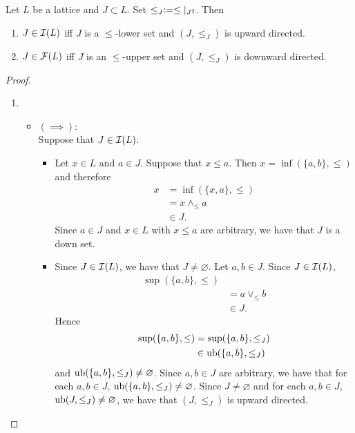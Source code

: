 \documentclass{book}
\begin{document}
	\begin{ex}
		Let $L$ be a lattice and $J \subset L$. Set $\leq_J \vcentcolon= \leq|_{J^2}$. Then
		\begin{enumerate}
			\item $J \in \mathcal{I}(L)$ iff $J$ is a $\leq$-lower set and $(J, \leq_J)$ is upward directed.   
			\item $J \in \mathcal{F}(L)$ iff $J$ is an $\leq$-upper set and $(J, \leq_J)$ is downward directed.
		\end{enumerate}
	\end{ex}
	
	\begin{proof}\
		\begin{enumerate}
			\item 
			\begin{itemize}
				\item $(\implies)$: \\
				Suppose that $J \in \mathcal{I}(L)$.
				\begin{itemize}
					\item Let $x \in L$ and $a \in J$. Suppose that $x \leq a$. Then $x = \inf(\{a,b\}, \leq)$ and therefore
					\begin{align*}
						x
						& = \inf(\{x, a\}, \leq) \\
						& = x \wedge_{\leq} a \\
						& \in J. 
					\end{align*}  
					Since $a \in J$ and $x \in L$ with $x \leq a$ are arbitrary, we have that $J$ is a down set. 
					\item Since $J \in \mathcal{I}(L)$, we have that $J \neq \varnothing$. Let $a, b \in J$. Since $J \in \mathcal{I}(L)$, 
					\begin{align*}
						\sup (\{a,b\}, \leq) \\
						& = a \vee_{\leq} b \\
						& \in J.
					\end{align*}
					Hence   
					\begin{align*}
						\sup (\{a,b\}, \leq)
						& = \sup (\{a,b\}, \leq_J) \\
						& \in \operatorname{ub}(\{a,b\}, \leq_J)
					\end{align*}
					and $\operatorname{ub}(\{a,b\}, \leq_J) \neq \varnothing$.
					Since $a,b \in J$ are arbitrary, we have that for each $a,b \in J$, $\operatorname{ub} (\{a,b\}, \leq_J) \neq \varnothing$. Since $J \neq \varnothing$ and for each $a,b \in J$, $\operatorname{ub}(J, \leq_J) \neq \varnothing$, we have that $(J, \leq_J)$ is upward directed.

\end{itemize}
\end{itemize}
\end{enumerate}
\end{proof}
\end{document}
